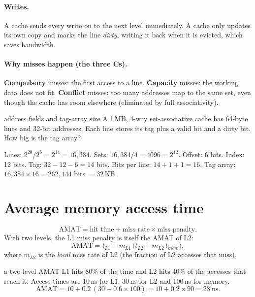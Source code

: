 \paragraph{Writes.} A  cache sends every write on to the next level immediately. A  cache only updates its own copy and marks the line \emph{dirty}, writing it back when it is evicted, which saves bandwidth.

\paragraph{Why misses happen (the three Cs).} \textbf{Compulsory} misses: the first access to a line. \textbf{Capacity} misses: the working data does not fit. \textbf{Conflict} misses: too many addresses map to the same set, even though the cache has room elsewhere (eliminated by full associativity).

\begin{worked}{address fields and tag-array size}
A 1\,MB, 4-way set-associative cache has 64-byte lines and 32-bit addresses. Each line stores its tag plus a valid bit and a dirty bit. How big is the tag array?

Lines: $2^{20}/2^6 = 2^{14} = 16{,}384$. Sets: $16{,}384/4 = 4096 = 2^{12}$.
Offset: 6 bits. Index: 12 bits. Tag: $32 - 12 - 6 = 14$ bits.
Bits per line: $14 + 1 + 1 = 16$. Tag array: $16{,}384 \times 16 = 262{,}144$ bits $= 32$\,KB.
\end{worked}

\section{Average memory access time}

\begin{bigidea}
\[
  \text{AMAT} = \text{hit time} + \text{miss rate} \times \text{miss penalty}.
\]
With two levels, the L1 miss penalty is itself the AMAT of L2:
\[
  \text{AMAT} = t_{L1} + m_{L1}\,\big(t_{L2} + m_{L2}\,t_{mem}\big),
\]
where $m_{L2}$ is the \emph{local} miss rate of L2 (the fraction of L2 accesses that miss).
\end{bigidea}

\begin{worked}{a two-level AMAT}
L1 hits 80\% of the time and L2 hits 40\% of the accesses that reach it. Access times are 10\,ns for L1, 30\,ns for L2 and 100\,ns for memory.
\[
  \text{AMAT} = 10 + 0.2\,(30 + 0.6 \times 100) = 10 + 0.2 \times 90 = 28~\text{ns}.
\]
\end{worked}

